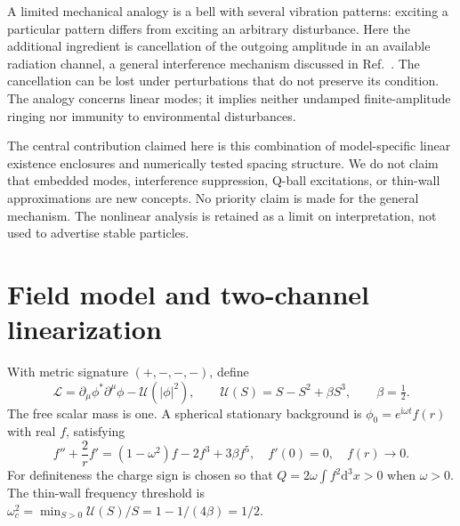 \documentclass[a4paper,11pt]{article}
\newcommand{\dd}{\mathrm{d}}
\newcommand{\ii}{\mathrm{i}}
\begin{document}
A limited mechanical analogy is a bell with several vibration patterns:
exciting a particular pattern differs from exciting an arbitrary disturbance.
Here the additional ingredient is cancellation of the outgoing amplitude
in an available radiation channel, a general interference mechanism
discussed in Ref.~\cite{FriedrichWintgen1985}. The cancellation can be lost
under perturbations that do not preserve its condition. The analogy concerns
linear modes; it implies neither undamped finite-amplitude ringing nor
immunity to environmental disturbances.

The central contribution claimed here is this combination of model-specific
linear existence enclosures and numerically tested spacing structure.
We do not claim that embedded modes, interference suppression, Q-ball
excitations, or thin-wall approximations are new concepts. No priority claim
is made for the general mechanism. The nonlinear analysis is retained as
a limit on interpretation, not used to advertise stable particles.


\section{Field model and two-channel linearization}\label{sec:model}
With metric signature $(+,-,-,-)$, define
\begin{equation}\label{eq:action}
\mathcal L=\partial_\mu\phi^*\partial^\mu\phi-\mathcal U(|\phi|^2),
\qquad \mathcal U(S)=S-S^2+\beta S^3,\qquad \beta=\tfrac12.
\end{equation}
The free scalar mass is one. A spherical stationary background is
$\phi_0=e^{\ii\omega t}f(r)$ with real $f$, satisfying
\begin{equation}\label{eq:profile}
f''+\frac2r f'=(1-\omega^2)f-2f^3+3\beta f^5,
\quad f'(0)=0,\quad f(r)\longrightarrow0.
\end{equation}
For definiteness the charge sign is chosen so that
$Q=2\omega\int f^2\dd^3x>0$ when $\omega>0$.
The thin-wall frequency threshold is
$\omega_c^2=\min_{S>0}\mathcal U(S)/S=1-1/(4\beta)=1/2$.
\end{document}
